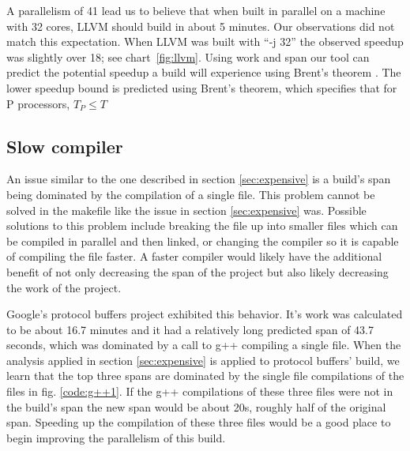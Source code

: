 \documentclass[sigconf,10pt,review,authorversion]{acmart}\settopmatter{printfolios=true,printccs=false,printacmref=false}
\begin{document}
A parallelism of 41 lead us to believe that when built in parallel on a machine with 32 cores,
LLVM should build in about 5 minutes.  Our observations did not match this expectation.  When LLVM was
built with ``-j 32'' the observed speedup was slightly over 18; see chart~\ref{fig:llvm}.  Using work and
span our tool can predict the potential speedup a build will experience using Brent's theorem
\cite{brents}.  The lower speedup bound is predicted using Brent's theorem, which specifies that for
P processors, \begin{math} T_P \leq T \end{math}



\subsection{Slow compiler}
\label{sec:compiler}

An issue similar to the one described in section \ref{sec:expensive} is a build's
span being dominated by the compilation of a single file.  This problem cannot be
solved in the makefile like the issue in section \ref{sec:expensive} was.
Possible solutions to this problem include
breaking the file up into smaller files which can be compiled in parallel and then
linked, or changing the compiler so it is capable of compiling the file faster.
A faster compiler would likely have the additional benefit of not only decreasing the span
of the project but also likely decreasing the work of the project.

Google's protocol buffers project \cite{protobufs3.6.1} exhibited this behavior.  It's work was calculated
to be about 16.7 minutes and it had a relatively
long predicted span of 43.7 seconds, which was dominated by a call to g++ compiling
a single file.  When the analysis applied in section \ref{sec:expensive} is applied
to protocol buffers' build, we learn that the top three spans are dominated by the
single file compilations of the files in fig. \ref{code:g++1}.  If the g++ compilations
of these three files were not in the build's span the new span would be about 20s,
roughly half of the original span.  Speeding up the compilation of these three files
would be a good place to begin improving the parallelism of this build.
\end{document}
